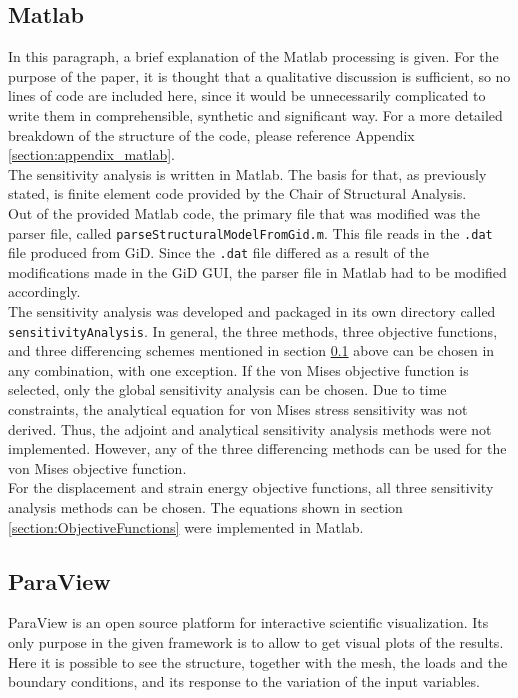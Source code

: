 \subsection{Matlab} \label{section:GiD}
In this paragraph, a brief explanation of the Matlab processing is given. For the purpose of the paper, it is thought that a qualitative discussion is sufficient, so no lines of code are included here, since it would be unnecessarily complicated to write them in comprehensible, synthetic and significant way. For a more detailed breakdown of the structure of the code, please reference Appendix \ref{section:appendix_matlab}.\\[3pt] 
The sensitivity analysis is written in Matlab. The basis for that, as previously stated, is finite element code provided by the Chair of Structural Analysis.\\[3pt]
Out of the provided Matlab code, the primary file that was modified was the parser file, called \texttt{parseStructuralModelFromGid.m}. This file reads in the \texttt{.dat} file produced from GiD. Since the \texttt{.dat} file differed as a result of the modifications made in the GiD GUI, the parser file in Matlab had to be modified accordingly.\\[3pt]
The sensitivity analysis was developed and packaged in its own directory called \texttt{sensitivityAnalysis}. In general, the three methods, three objective functions, and three differencing schemes mentioned in section \ref{section:GiD} above can be chosen in any combination, with one exception. If the von Mises objective function is selected, only the global sensitivity analysis can be chosen. Due to time constraints, the analytical equation for von Mises stress sensitivity was not derived. Thus, the adjoint and analytical sensitivity analysis methods were not implemented. However, any of the three differencing methods can be used for the von Mises objective function.\\[3pt]
For the displacement and strain energy objective functions, all three sensitivity analysis methods can be chosen. The equations shown in section \ref{section:ObjectiveFunctions} were implemented in Matlab.

\subsection{ParaView}
ParaView is an open source platform for interactive scientific visualization. Its only purpose in the given framework is to allow to get visual plots of the results. Here it is possible to see the structure, together with the mesh, the loads and the boundary conditions, and its response to the variation of the input variables. 


